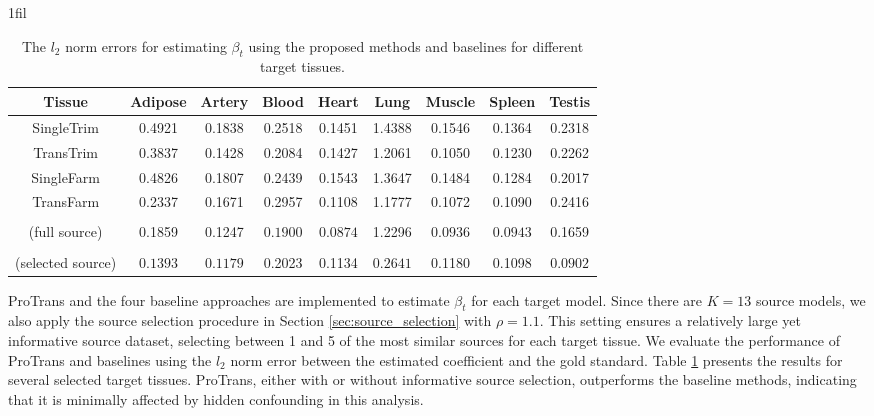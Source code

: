 \documentclass[12pt]{article}
\makeatletter
\newcommand*{\centerfloat}{%
  \parindent \z@
  \leftskip \z@ \@plus 1fil \@minus \marginparwidth
  \rightskip \leftskip
  \parfillskip \z@skip}
\makeatother
\begin{document}
\begin{table}[ht]
\renewcommand{\arraystretch}{0.65}
\footnotesize
    \centerfloat
    \caption{The $l_2$ norm errors for estimating $\beta_t$ using the proposed methods and baselines for different target tissues.}
    \label{tab:gene_estimation}
    \begin{tabular}{ccccccccc}
        \toprule
        \textbf{Tissue} & Adipose  &Artery & Blood &Heart &  Lung & Muscle & Spleen&  Testis\\
        \midrule
        SingleTrim &0.4921 & 0.1838 &0.2518 &0.1451 &  1.4388 & 0.1546 & 0.1364 & 0.2318 \\
        TransTrim &0.3837 & 0.1428 &0.2084 &0.1427 &  1.2061 & 0.1050 & 0.1230&   0.2262  \\
        SingleFarm &  0.4826 & 0.1807 &0.2439 &0.1543 &1.3647 & 0.1484& 0.1284 &    0.2017  \\
        TransFarm & 0.2337 & 0.1671 &0.2957 & 0.1108 & 1.1777 & 0.1072 & 0.1090&   0.2416 \\
        \vspace{-0.25cm}\makecell[c]{ProTrans \vspace{-0.5cm}\\ (full source)} &0.1859 & 0.1247 &$\bm{0.1900}$ &  $\bm{0.0874}$ & 1.2296 & $\bm{0.0936}$ & $\bm{0.0943}$&  0.1659  \\
        \makecell[c]{ProTrans \vspace{-0.5cm}\\ (selected source)} & $\bm{0.1393}$ & $\bm{0.1179}$ & 0.2023 & 0.1134 & $\bm{0.2641}$ & 0.1180 & 0.1098 & $\bm{0.0902}$\\
        \bottomrule
    \end{tabular}
\end{table}


ProTrans and the four baseline approaches are implemented to estimate $\beta_t$ for each target model. Since there are $K = 13$ source models, we also apply the source selection procedure in Section \ref{sec:source_selection} with $\rho =1.1$. This setting ensures a relatively large yet informative source dataset, selecting between 1 and 5 of the most similar sources for each target tissue. We evaluate the performance of ProTrans and baselines using the $l_2$ norm error between the estimated coefficient and the gold standard. Table \ref{tab:gene_estimation} presents the results for several selected target tissues. ProTrans, either with or without informative source selection, outperforms the baseline methods, indicating that it is minimally affected by hidden confounding in this analysis. 
\end{document}
